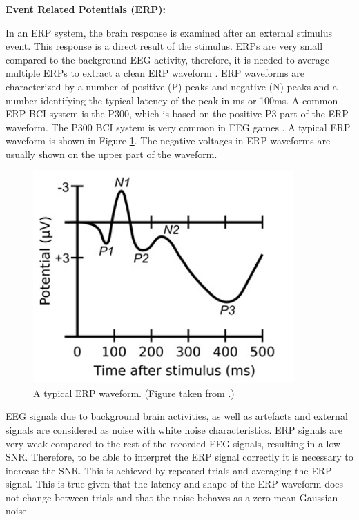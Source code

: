 \vspace {15pt}
\textbf{Event Related Potentials (ERP):}

In an ERP system, the brain response is examined after an external stimulus event. This response is a direct result of the stimulus. ERPs are very small compared to the background EEG activity, therefore, it is needed to average multiple ERPs to extract a clean ERP waveform \citep{Sanei2007}. ERP waveforms are characterized by a number of positive (P) peaks and negative (N) peaks and a number identifying the typical latency of the peak in ms or 100ms. A common ERP BCI system is the P300, which is based on the positive P3 part of the ERP waveform. The P300 BCI system is very common in EEG games \citep{Kerous2018}. A typical ERP waveform is shown in Figure \ref{ERP_F}. The negative voltages in ERP waveforms are usually shown on the upper part of the waveform.

\begin{figure}
	\centering
	\includegraphics[width=10cm]{Figures/ERP.jpg} %
	\caption{A typical ERP waveform. (Figure taken from  \citep{Sanei2007}.) }
	\label{ERP_F} %
\end{figure}

EEG signals due to background brain activities, as well as artefacts and external signals are considered as noise with white noise characteristics. ERP signals are very weak compared to the rest of the recorded EEG signals, resulting in a low SNR. Therefore, to be able to interpret the ERP signal correctly it is necessary to increase the SNR. This is achieved by repeated trials and averaging the ERP signal. This is true given that the latency and shape of the ERP waveform does not change between trials and that the noise behaves as a zero-mean Gaussian noise.


